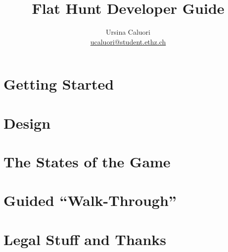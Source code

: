 \documentclass[a4paper,titlepage,12pt]{article}
\title{\textbf{Flat Hunt Developer Guide}}
\author{Ursina Caluori\\ \href{mailto: ucaluori@student.ethz.ch}{ucaluori@student.ethz.ch}}
\begin{document}
  \maketitle
  \tableofcontents
  \pagebreak

  
  
  \section{Getting Started}
    
  \section{Design}
    
  \section{The States of the Game}
     
  \section{Guided ``Walk-Through''}
    
  \section{Legal Stuff and Thanks}
    
    
    
\end{document}
